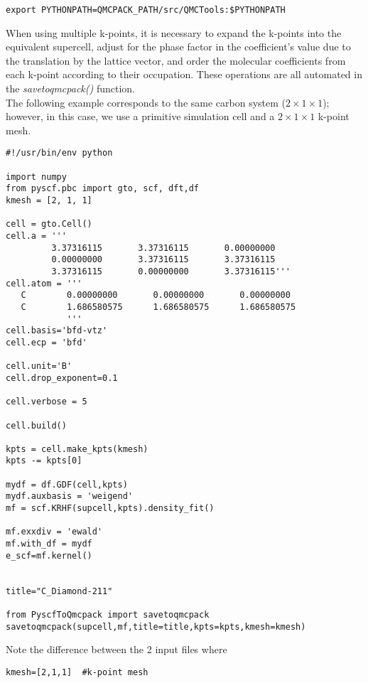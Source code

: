 \begin{lstlisting}[style=SHELL]
export PYTHONPATH=QMCPACK_PATH/src/QMCTools:$PYTHONPATH
\end{lstlisting}

When using multiple k-points, it is necessary to expand the k-points into the equivalent supercell, adjust for the phase factor in the coefficient's value due to the translation by the lattice vector, and order the molecular coefficients from each k-point according to their occupation. These operations are all automated in the \textit{savetoqmcpack()} function.\\

The following example corresponds to the same carbon system ($2 \times 1 \times 1$); however, in this case, we use a primitive simulation cell and a $2 \times 1 \times 1$ k-point mesh.   

\begin{lstlisting}[style=Python,caption=Example PySCF input for single k-point calculation for a $2 \times 1 \times 1$ carbon supercell.]
#!/usr/bin/env python

import numpy
from pyscf.pbc import gto, scf, dft,df
kmesh = [2, 1, 1]

cell = gto.Cell()
cell.a = '''
         3.37316115       3.37316115       0.00000000
         0.00000000       3.37316115       3.37316115
         3.37316115       0.00000000       3.37316115'''
cell.atom = '''  
   C        0.00000000       0.00000000       0.00000000
   C        1.686580575      1.686580575      1.686580575 
            '''
cell.basis='bfd-vtz'
cell.ecp = 'bfd'

cell.unit='B'
cell.drop_exponent=0.1

cell.verbose = 5

cell.build()

kpts = cell.make_kpts(kmesh)
kpts -= kpts[0]

mydf = df.GDF(cell,kpts)
mydf.auxbasis = 'weigend'
mf = scf.KRHF(supcell,kpts).density_fit()

mf.exxdiv = 'ewald'
mf.with_df = mydf
e_scf=mf.kernel()


title="C_Diamond-211"

from PyscfToQmcpack import savetoqmcpack
savetoqmcpack(supcell,mf,title=title,kpts=kpts,kmesh=kmesh)

\end{lstlisting}



Note the difference between the 2 input files where\\
\begin{lstlisting}
kmesh=[2,1,1]  #k-point mesh
\end{lstlisting}

